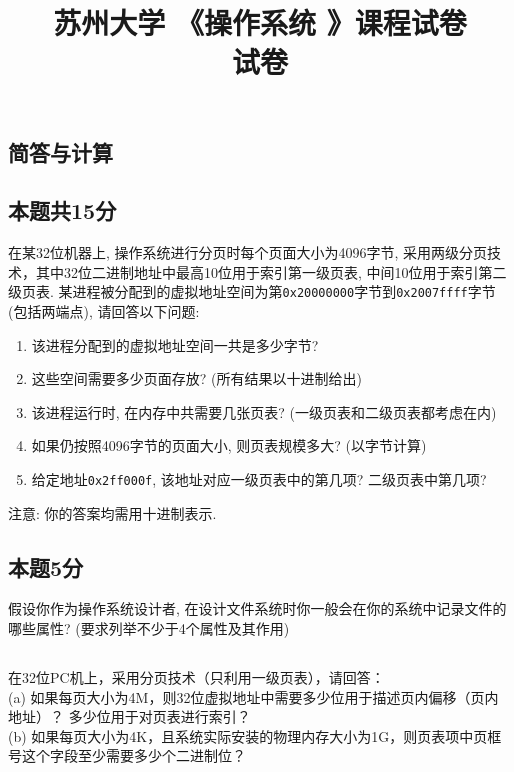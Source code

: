\documentclass[a4paper,11pt]{article}
\title{苏州大学 《操作系统 》课程试卷 \\ 试卷}
\date{}
\begin{document}
\begin{CJK*}{UTF8}{gbsn}

\maketitle

\section{简答与计算}
\subsection{本题共15分}
在某32位机器上, 操作系统进行分页时每个页面大小为4096字节, 采用两级分页技术，其中32位二进制地址中最高10位用于索引第一级页表,
中间10位用于索引第二级页表. 某进程被分配到的虚拟地址空间为第\verb|0x20000000|字节到\verb|0x2007ffff|字节(包括两端点), 
请回答以下问题:
\begin{enumerate}
\item 该进程分配到的虚拟地址空间一共是多少字节? 
\item 这些空间需要多少页面存放? (所有结果以十进制给出)
\item 该进程运行时, 在内存中共需要几张页表? (一级页表和二级页表都考虑在内)
\item 如果仍按照4096字节的页面大小, 则页表规模多大? (以字节计算)
\item 给定地址\verb|0x2ff000f|, 该地址对应一级页表中的第几项? 二级页表中第几项?
\end{enumerate}
注意: 你的答案均需用十进制表示.
\\[3in]


\subsection{本题5分}
假设你作为操作系统设计者, 在设计文件系统时你一般会在你的系统中记录文件的哪些属性? (要求列举不少于4个属性及其作用)
\\[1in]

\subsection{}
在32位PC机上，采用分页技术（只利用一级页表），请回答： \\%
(a) 如果每页大小为4M，则32位虚拟地址中需要多少位用于描述页内偏移（页内地址）？ 多少位用于对页表进行索引？\\
(b) 如果每页大小为4K，且系统实际安装的物理内存大小为1G，则页表项中页框号这个字段至少需要多少个二进制位？
\\[1in]


\end{CJK*}
\end{document}

